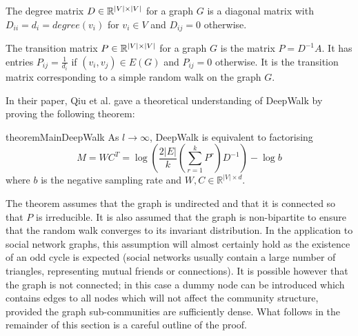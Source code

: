 \documentclass[a4paper]{article}
\begin{document}
\begin{definition}
  The degree matrix $D \in \R^{|V| \times |V|}$ for a graph $G$ is a diagonal
  matrix with $D_{ii} = d_i = degree(v_i)$ for $v_i \in V$ and $D_{ij} = 0$ otherwise.
\end{definition}

\begin{definition}
  The transition matrix $P \in \R^{|V| \times |V|}$ for a graph $G$ is the
  matrix $P = D^{-1}A$. It has entries $P_{ij} = \frac{1}{d_i}$ if $(v_i, v_j)
  \in E(G)$ and $P_{ij} = 0$ otherwise. It is the transition matrix
  corresponding to a simple random walk on the graph $G$. 
\end{definition}
In their paper, Qiu et al. gave a theoretical understanding of DeepWalk by proving the following theorem:
\begin{restatable}{theorem}{MainDeepWalk}
  As $l \to \infty$, DeepWalk is equivalent to factorising
  \[M = WC^T = \log{\left(\frac{2|E|}{k}\left( \sum_{r = 1}^k P^r  \right) D^{-1}
      \right)} - \log{b}\]
  where $b$ is the negative sampling rate and $W, C \in \mathbb{R}^{|V| \times d}$.
\end{restatable}
\noindent The theorem assumes that the graph is undirected and that it is connected so
that $P$ is irreducible. It is also assumed that the graph is
non-bipartite to ensure that the random walk converges to its invariant distribution. In the application to
social network graphs, this
assumption will almost certainly hold as the existence of an odd cycle is
expected (social networks usually contain a large number of triangles,
representing mutual friends or connections). It is possible however that the
graph is not connected; in this case a dummy node can be introduced which
contains edges to all nodes which will not affect the community structure,
provided the graph sub-communities are sufficiently dense.
What follows in the remainder of this section is a careful outline of the proof.
\end{document}
